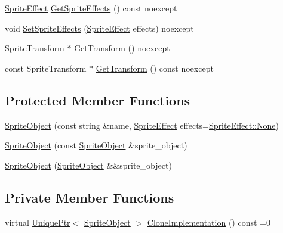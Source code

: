 \begin{DoxyCompactItemize}
\item 
\hyperlink{namespacemage_a9cfe18123066ba4236f548f9de75d881}{Sprite\+Effect} \hyperlink{classmage_1_1_sprite_object_a05f4124356abc1eec2158017ef3d947e}{Get\+Sprite\+Effects} () const noexcept
\item 
void \hyperlink{classmage_1_1_sprite_object_aef6cf252d79c9fcec978d83642da0e9a}{Set\+Sprite\+Effects} (\hyperlink{namespacemage_a9cfe18123066ba4236f548f9de75d881}{Sprite\+Effect} effects) noexcept
\item 
Sprite\+Transform $\ast$ \hyperlink{classmage_1_1_sprite_object_a709751381e87803088fc7013043bc65e}{Get\+Transform} () noexcept
\item 
const Sprite\+Transform $\ast$ \hyperlink{classmage_1_1_sprite_object_ada7bf149994abd24c652b83e8f9374ec}{Get\+Transform} () const noexcept
\end{DoxyCompactItemize}
\subsection*{Protected Member Functions}
\begin{DoxyCompactItemize}
\item 
\hyperlink{classmage_1_1_sprite_object_af68fccf1e8a51f5b4a99a48dfb515f65}{Sprite\+Object} (const string \&name, \hyperlink{namespacemage_a9cfe18123066ba4236f548f9de75d881}{Sprite\+Effect} effects=\hyperlink{namespacemage_a9cfe18123066ba4236f548f9de75d881a6adf97f83acf6453d4a6a4b1070f3754}{Sprite\+Effect\+::\+None})
\item 
\hyperlink{classmage_1_1_sprite_object_ac75871029cd740aeb0dd3e23d037b703}{Sprite\+Object} (const \hyperlink{classmage_1_1_sprite_object}{Sprite\+Object} \&sprite\+\_\+object)
\item 
\hyperlink{classmage_1_1_sprite_object_a32243a50679f743554850069f27cca9b}{Sprite\+Object} (\hyperlink{classmage_1_1_sprite_object}{Sprite\+Object} \&\&sprite\+\_\+object)
\end{DoxyCompactItemize}
\subsection*{Private Member Functions}
\begin{DoxyCompactItemize}
\item 
virtual \hyperlink{namespacemage_a3316d7143a973e37adf1110f2e80ca31}{Unique\+Ptr}$<$ \hyperlink{classmage_1_1_sprite_object}{Sprite\+Object} $>$ \hyperlink{classmage_1_1_sprite_object_acbbe3d5894e5a43df411b7e5785ae174}{Clone\+Implementation} () const =0
\end{DoxyCompactItemize}
